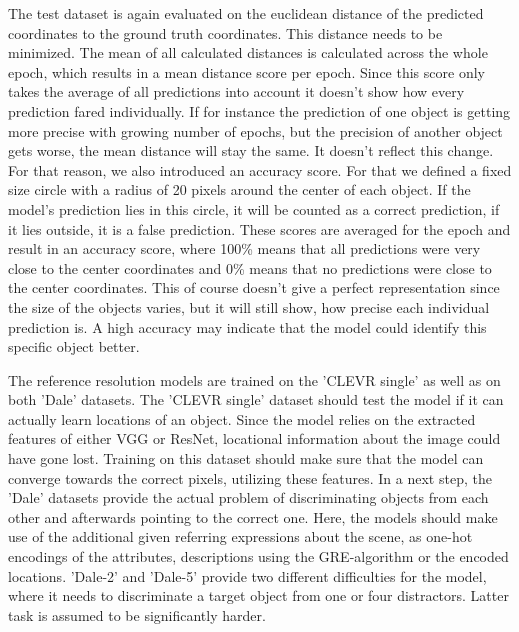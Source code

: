 The test dataset is again evaluated on the euclidean distance of the predicted coordinates to the ground truth coordinates.
This distance needs to be minimized.
The mean of all calculated distances is calculated across the whole epoch, which results in a mean distance score per epoch.
Since this score only takes the average of all predictions into account it doesn't show how every prediction fared individually.
If for instance the prediction of one object is getting more precise with growing number of epochs, but the precision of another object gets worse, the mean distance will stay the same.
It doesn't reflect this change.
For that reason, we also introduced an accuracy score.
For that we defined a fixed size circle with a radius of 20 pixels around the center of each object.
If the model's prediction lies in this circle, it will be counted as a correct prediction, if it lies outside, it is a false prediction.
These scores are averaged for the epoch and result in an accuracy score, where 100\% means that all predictions were very close to the center coordinates and 0\% means that no predictions were close to the center coordinates.
This of course doesn't give a perfect representation since the size of the objects varies, but it will still show, how precise each individual prediction is.
A high accuracy may indicate that the model could identify this specific object better.

The reference resolution models are trained on the 'CLEVR single' as well as on both 'Dale' datasets.
The 'CLEVR single' dataset should test the model if it can actually learn locations of an object.
Since the model relies on the extracted features of either VGG or ResNet, locational information about the image could have gone lost.
Training on this dataset should make sure that the model can converge towards the correct pixels, utilizing these features.
In a next step, the 'Dale' datasets provide the actual problem of discriminating objects from each other and afterwards pointing to the correct one.
Here, the models should make use of the additional given referring expressions about the scene, as one-hot encodings of the attributes, descriptions using the GRE-algorithm or the encoded locations.
'Dale-2' and 'Dale-5' provide two different difficulties for the model, where it needs to discriminate a target object from one or four distractors.
Latter task is assumed to be significantly harder.

